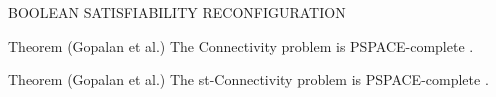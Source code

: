 \begin{frame}{BOOLEAN SATISFIABILITY RECONFIGURATION}
    \begin{block}{Theorem (Gopalan et al.)}
    The Connectivity problem is PSPACE-complete \cite{gopalan_connectivity_2006}. 
    \end{block}

    \begin{block}{Theorem (Gopalan et al.)}
    The st-Connectivity problem is PSPACE-complete \cite{gopalan_connectivity_2006}. 
    \end{block}

\end{frame}

